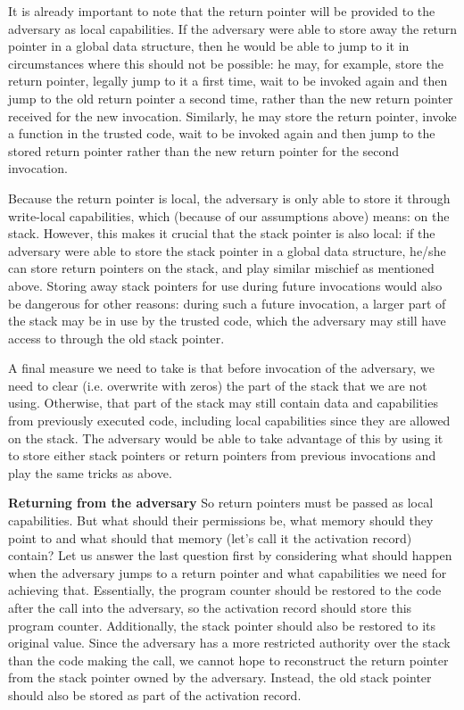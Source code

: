 \documentclass[compsoc,conference,letterpaper,fleqn]{IEEEtran}
\begin{document}
It is already important to note that the return pointer
will be provided to the adversary as local capabilities. If the adversary were
able to store away the return pointer in a global data structure, then he would
be able to jump to it in circumstances where this should not be possible: he
may, for example, store the return pointer, legally jump to it a first time,
wait to be invoked again and then jump to the old return pointer a second time,
rather than the new return pointer received for the new invocation. Similarly,
he may store the return pointer, invoke a function in the trusted code, wait to
be invoked again and then jump to the stored return pointer rather than the new
return pointer for the second invocation.

Because the return pointer is local, the adversary is only able to store it
through write-local capabilities, which (because of our assumptions above)
means: on the stack. However, this makes it crucial that the stack pointer is
also local: if the adversary were able to store the stack pointer in a global
data structure, he/she can store return pointers on the stack, and play similar
mischief as mentioned above. Storing away stack pointers for use during future
invocations would also be dangerous for other reasons: during such a future
invocation, a larger part of the stack may be in use by the trusted code, which
the adversary may still have access to through the old stack pointer.

A final measure we need to take is that before invocation of the adversary, we
need to clear (i.e. overwrite with zeros) the part of the stack that we are not
using.  Otherwise, that part of the stack may still contain data and
capabilities from previously executed code, including local capabilities since
they are allowed on the stack.  The adversary would be able to take advantage of
this by using it to store either stack pointers or return pointers from previous
invocations and play the same tricks as above.

\textbf{Returning from the adversary}
So return pointers must be passed as local capabilities. But what should their
permissions be, what memory should they point to and what should that memory
(let's call it the activation record) contain? Let us answer the last question
first by considering what should happen when the adversary jumps to a return
pointer and what capabilities we need for achieving that. Essentially, the
program counter should be restored to the code after the call into the
adversary, so the activation record should store this program counter.
Additionally, the stack pointer should also be restored to its original value.
Since the adversary has a more restricted authority over the stack than the code
making the call, we cannot hope to reconstruct the return pointer from the stack
pointer owned by the adversary. Instead, the old stack pointer should also be
stored as part of the activation record.
\end{document}
